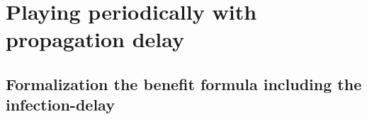 %
%
%
%
%




\section{Playing periodically with propagation delay}
\label{ch2:periodicvirus}







\subsection{Formalization the benefit formula including the infection-delay}



